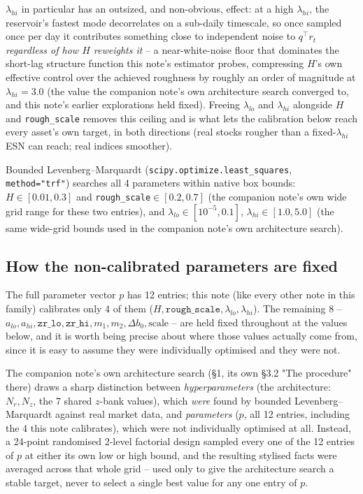 \documentclass[11pt]{article}
\begin{document}
$\lambda_{hi}$ in particular has an outsized, and non-obvious, effect: at a high
$\lambda_{hi}$, the reservoir's fastest mode decorrelates on a sub-daily timescale,
so once sampled once per day it contributes something close to independent noise to
$q^\top r_t$ \emph{regardless of how $H$ reweights it} -- a near-white-noise floor
that dominates the short-lag structure function this note's estimator probes,
compressing $H$'s own effective control over the achieved roughness by roughly an
order of magnitude at $\lambda_{hi}=3.0$ (the value the companion note's own
architecture search converged to, and this note's earlier explorations held fixed).
Freeing $\lambda_{lo}$ and $\lambda_{hi}$ alongside $H$ and \texttt{rough\_scale}
removes this ceiling and is what lets the calibration below reach every asset's own
target, in both directions (real stocks rougher than a fixed-$\lambda_{hi}$
ESN can reach; real indices smoother).

Bounded Levenberg--Marquardt (\texttt{scipy.optimize.least\_squares},
\texttt{method="trf"}) searches all 4 parameters within native box bounds:
$H\in[0.01,0.3]$ and \texttt{rough\_scale}$\in[0.2,0.7]$ (the companion note's own
wide grid range for these two entries), and $\lambda_{lo}\in[10^{-5},0.1]$,
$\lambda_{hi}\in[1.0,5.0]$ (the same wide-grid bounds used in the companion note's
own architecture search).

\subsection{How the non-calibrated parameters are fixed}
\label{sec:pfixed}
The full parameter vector $p$ has 12 entries; this note (like every other note in
this family) calibrates only 4 of them ($H,\texttt{rough\_scale},\lambda_{lo},
\lambda_{hi}$). The remaining 8 -- $a_{lo},a_{hi},\texttt{zr\_lo},\texttt{zr\_hi},
m_1,m_2,\Delta b_0,\text{scale}$ -- are held fixed throughout at the values below,
and it is worth being precise about where those values actually come from, since
it is easy to assume they were individually optimised and they were not.

The companion note's own architecture search (\S1, its own \S3.2 "The procedure"
there) draws a sharp distinction between \emph{hyperparameters} (the
architecture: $N_r,N_z$, the 7 shared $z$-bank values), which \emph{were}
found by bounded Levenberg--Marquardt against real market data, and
\emph{parameters} ($p$, all 12 entries, including the 4 this note calibrates),
which were not individually optimised at all. Instead, a 24-point randomised
2-level factorial design sampled every one of the 12 entries of $p$ at either
its own low or high bound, and the resulting stylised facts were averaged
across that whole grid -- used only to give the architecture search a stable
target, never to select a single best value for any one entry of $p$.
\end{document}

